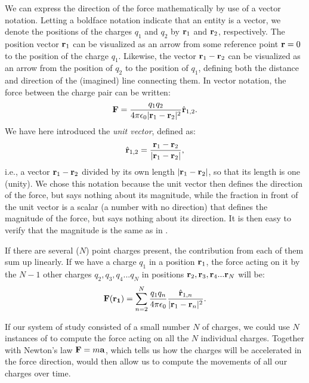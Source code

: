 We can express the direction of the force mathematically by use of a vector notation. Letting a boldface notation indicate that an entity is a vector, we denote the positions of the charges $q_1$ and $q_2$ by ${\bf r}_1$ and ${\bf r}_2$, respectively. The position vector ${\bf r}_1$ can be visualized as an arrow from some reference point ${\bf r} =0$ to the position of the charge $q_1$. Likewise, the vector ${\bf r}_1-{\bf r}_2$ can be visualized as an arrow from the position of $q_2$ to the position of $q_1$, defining both the distance and direction of the (imagined) line connecting them. In vector notation, the force between the charge pair can be written:
\begin{equation}
{\bf F} = \frac{q_1q_2}{4\pi \epsilon_0 |{\bf r}_1-{\bf r}_2|^2} \hat{{\bf r}}_{1,2}.
\label{eq:Basics:CoulombFvec}
\end{equation}
We have here introduced the \textit{unit vector}, defined as: 
\begin{equation}
\hat{{\bf r}}_{1,2} = \frac{{\bf r}_1 - {\bf r}_2}{|{\bf r}_1-{\bf r}_2|}, 
\label{eq:Basics:UnitVector}
\end{equation}
i.e., a vector ${\bf r}_1-{\bf r}_2$ divided by its own length $|{\bf r}_1-{\bf r}_2|$, so that its length is one (unity). We chose this notation because the unit vector then defines the direction of the force, but says nothing about its magnitude, while the fraction in front of the unit vector is a scalar (a number with no direction) that defines the magnitude of the force, but  says nothing about its direction. It is then easy to verify that the magnitude is the same as in .

If there are several ($N$) point charges present, the contribution from each of them sum up linearly. If we have a charge $q_1$ in a position ${\bf r}_1$, the force acting on it by the $N-1$ other charges $q_2, q_3, q_4 ... q_{N}$ in positions ${\bf r}_2, {\bf r}_3, {\bf r}_4 ... {\bf r}_{N}$ will be:
\begin{equation}
{\bf F}({\bf r_1}) = \sum_{n=2}^{N} \frac{q_1 q_n}{4\pi \epsilon_0} \frac{\hat{{\bf r}}_{1,n}}{|{\bf r}_1-{\bf r}_n|^2}.
\label{eq:Basics:CoulombFN}
\end{equation}

If our system of study consisted of a small number $N$ of charges, we could use $N$ instances of  to compute the force acting on all the $N$ individual charges. Together with Newton's law ${\bf F} = m {\bf a}$, which tells us how the charges will be accelerated in the force direction,  would then allow us to compute the movements of all our charges over time. 

